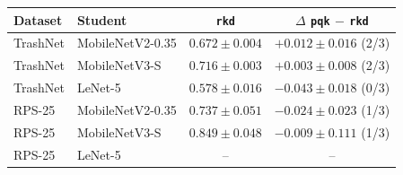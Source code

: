 \begin{tabular}{@{}llcc@{}}
\toprule
Dataset & Student & \texttt{rkd} & $\Delta$ \texttt{pqk} $-$ \texttt{rkd} \\
\midrule
TrashNet & MobileNetV2-0.35 & $0.672\pm0.004$ & $+0.012\pm0.016$ (2/3) \\
TrashNet & MobileNetV3-S & $0.716\pm0.003$ & $+0.003\pm0.008$ (2/3) \\
TrashNet & LeNet-5 & $0.578\pm0.016$ & $-0.043\pm0.018$ (0/3) \\
RPS-25 & MobileNetV2-0.35 & $0.737\pm0.051$ & $-0.024\pm0.023$ (1/3) \\
RPS-25 & MobileNetV3-S & $0.849\pm0.048$ & $-0.009\pm0.111$ (1/3) \\
RPS-25 & LeNet-5 & -- & -- \\
\bottomrule
\end{tabular}
